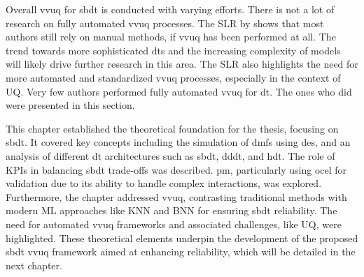 Overall \gls{vvuq} for \gls{sbdt} is conducted with varying efforts. There is not a lot of research on fully automated \gls{vvuq} processes. The SLR by \textcite{Bitencourt2023} shows that most authors still rely on manual methods, if \gls{vvuq} has been performed at all. The trend towards more sophisticated \gls{dt}s and the increasing complexity of models will likely drive further research in this area. The SLR also highlights the need for more automated and standardized \gls{vvuq} processes, especially in the context of UQ. Very few authors performed fully automated \gls{vvuq} for \gls{dt}. The ones who did were presented in this section.

This chapter established the theoretical foundation for the thesis, focusing on \gls{sbdt}. It covered key concepts including the simulation of \gls{dmfs} using \gls{des}, and an analysis of different \gls{dt} architectures such as \gls{sbdt}, \gls{dddt}, and \gls{hdt}. The role of KPIs in balancing \gls{sbdt} trade-offs was described. \gls{pm}, particularly using \gls{ocel} for validation due to its ability to handle complex interactions, was explored. Furthermore, the chapter addressed \gls{vvuq}, contrasting traditional methods with modern ML approaches like KNN and BNN for ensuring \gls{sbdt} reliability. The need for automated \gls{vvuq} frameworks and associated challenges, like UQ, were highlighted. These theoretical elements underpin the development of the proposed \gls{sbdt} \gls{vvuq} framework aimed at enhancing reliability, which will be detailed in the next chapter.




